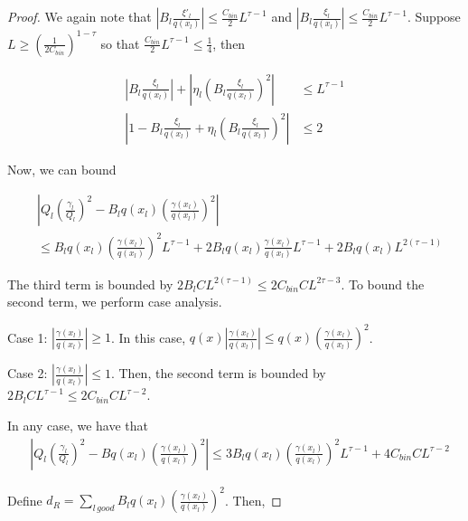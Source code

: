 \begin{proof}
We again note that $\left| B_l \frac{\xi'_l}{q(x_l)} \right| \leq \frac{C_{bin}}{2} L^{\tau-1}$ and 
$\left| B_l \frac{\xi_l}{q(x_l)} \right| \leq \frac{C_{bin}}{2} L^{\tau-1}$. Suppose $L \geq \left( \frac{1}{2 C_{bin}} \right)^{1 - \tau}$ so that $\frac{C_{bin}}{2} L^{\tau - 1} \leq \frac{1}{4}$, then


\begin{align*}
 \left| B_l \frac{\xi_l}{q(x_l)} \right|  + \left| \eta_l ( B_l \frac{\xi_l}{q(x_l)} )^2 \right| &\leq L^{\tau - 1} \\
 \left| 1 - B_l \frac{\xi_l}{q(x_l)} + \eta_l ( B_l \frac{\xi_l}{q(x_l)} )^2 \right| &\leq 2
\end{align*}

Now, we can bound

\begin{align*}
& \left| Q_l \left( \frac{\gamma_l}{Q_l} \right)^2 
         - B_l q(x_l) \left( \frac{\gamma(x_l)}{q(x_l)} \right)^2 \right| \\
& \leq B_l q(x_l) \left( \frac{\gamma(x_l)}{q(x_l)} \right)^2 L^{\tau - 1} +
       2 B_l q(x_l) \frac{\gamma(x_l)}{q(x_l)} L^{\tau - 1} +
       2 B_l q(x_l) L^{2(\tau-1)} 
\end{align*}

The third term is bounded by $2B_l C L^{2(\tau -1)} \leq 2C_{bin} C L^{2\tau - 3}$. To bound the second term, we perform case analysis. 

Case 1: $\left|\frac{\gamma(x_l)}{q(x_l)}\right| \geq 1$. In this case, 
$q(x) \left| \frac{\gamma(x_l)}{q(x_l)} \right| 
  \leq q(x) \left( \frac{\gamma(x_l)}{q(x_l)} \right)^2 $.

Case 2: $\left| \frac{\gamma(x_l)}{q(x_l)} \right| \leq 1$. Then, the second term is bounded by $2 B_l C L^{\tau - 1 } \leq 2 C_{bin} C L^{\tau - 2}$.

In any case, we have that
\begin{align*}
& \left| Q_l \left( \frac{\gamma_l}{Q_l} \right)^2 
         - B q(x_l) \left( \frac{\gamma(x_l)}{q(x_l)} \right)^2 \right| 
  \leq 3 B_l q(x_l) \left( \frac{\gamma(x_l)}{q(x_l)} \right)^2 L^{\tau - 1} +
       4 C_{bin} C  L^{\tau - 2}
\end{align*}

Define $d_R = \sum_{l \, good} B_l q(x_l) \left( \frac{\gamma(x_l)}{q(x_l)} \right)^2$. Then,


\end{proof}
